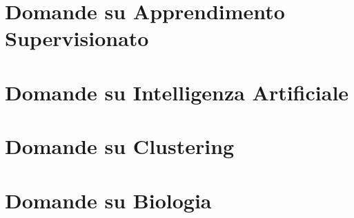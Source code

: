\chapter{Domande su Apprendimento Supervisionato}


\chapter{Domande su Intelligenza Artificiale}


\chapter{Domande su Clustering}


\chapter{Domande su Biologia}




